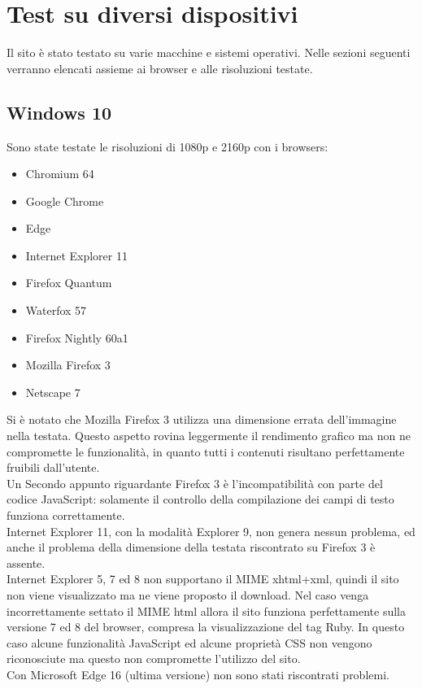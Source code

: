 \documentclass[openany, a4paper, 12pt]{report}
\begin{document}
		\section{Test su diversi dispositivi}
			Il sito è stato testato su varie macchine e sistemi operativi. Nelle sezioni seguenti verranno elencati assieme ai browser e alle risoluzioni testate.
				\subsection{Windows 10}
				Sono state testate le risoluzioni di 1080p e 2160p con i browsers:
				\begin{itemize}
					\item Chromium 64
					\item Google Chrome
					\item Edge
					\item Internet Explorer 11
					\item Firefox Quantum
					\item Waterfox 57
					\item Firefox Nightly 60a1
					\item Mozilla Firefox 3
					\item Netscape 7
				\end{itemize}
				Si è notato che Mozilla Firefox 3 utilizza una dimensione errata dell'immagine nella testata. Questo aspetto rovina leggermente il rendimento grafico ma non ne compromette le funzionalità, in quanto tutti i contenuti risultano perfettamente fruibili dall'utente.\\
				Un Secondo appunto riguardante Firefox 3 è l'incompatibilità con parte del codice JavaScript: solamente il controllo della compilazione dei campi di testo funziona correttamente.\\
				Internet Explorer 11, con la modalità Explorer 9, non genera nessun problema, ed anche il problema della dimensione della testata riscontrato su Firefox 3 è assente.\\
				Internet Explorer 5, 7 ed 8 non supportano il MIME xhtml+xml, quindi il sito non viene visualizzato ma ne viene proposto il download. Nel caso venga incorrettamente settato il MIME html allora il sito funziona perfettamente sulla versione 7 ed 8 del browser, compresa la visualizzazione del tag Ruby. In questo caso alcune funzionalità JavaScript ed alcune proprietà CSS non vengono riconosciute ma questo non compromette l'utilizzo del sito.\\ 
				Con Microsoft Edge 16 (ultima versione) non sono stati riscontrati problemi. \\
\end{document}
